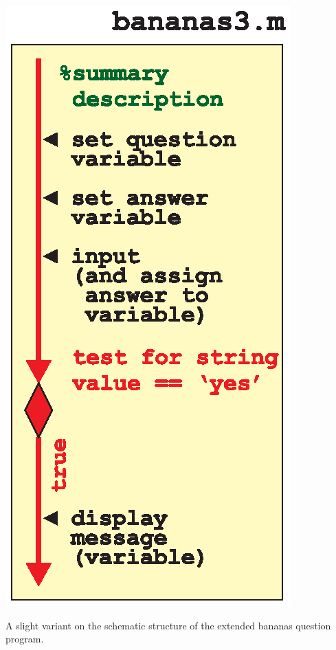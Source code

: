 \documentclass{tufte-book} %
\begin{document}
\begin{marginfigure}[-0.0in]
\includegraphics[width=\linewidth]{ch2-bananas3.eps}
\caption{A slight variant on the schematic structure of the extended bananas question program.}
\label{fig:ch2-bananas3}
\end{marginfigure}
\end{document}
